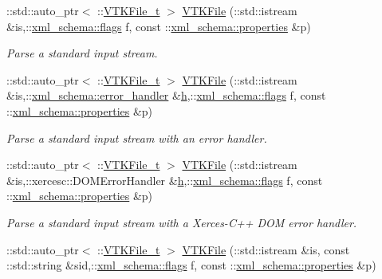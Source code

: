 \begin{DoxyCompactItemize}
\-::std\-::auto\-\_\-ptr$<$ \-::\hyperlink{classVTKFile__t}{V\-T\-K\-File\-\_\-t} $>$ \hyperlink{vtk-unstructured_8cpp_a614c44588111461ff8af6c4958a7f346}{V\-T\-K\-File} (\-::std\-::istream \&is,\-::\hyperlink{namespacexml__schema_a0612287d030cb2732d31a45b258fdc87}{xml\-\_\-schema\-::flags} f, const \-::\hyperlink{namespacexml__schema_a1a8ebac679580b41baebd62c7d641c1d}{xml\-\_\-schema\-::properties} \&p)
\begin{DoxyCompactList}\small\item\em Parse a standard input stream. \end{DoxyCompactList}\item 
\-::std\-::auto\-\_\-ptr$<$ \-::\hyperlink{classVTKFile__t}{V\-T\-K\-File\-\_\-t} $>$ \hyperlink{vtk-unstructured_8cpp_ae23aec4e78c9498c7c876f961fa7cf89}{V\-T\-K\-File} (\-::std\-::istream \&is,\-::\hyperlink{namespacexml__schema_a0a5d9528e9175cedf199984a8bb64d62}{xml\-\_\-schema\-::error\-\_\-handler} \&\hyperlink{MolSim_8cpp_aa6e8e201edf24007dc075bfef6e8210c}{h},\-::\hyperlink{namespacexml__schema_a0612287d030cb2732d31a45b258fdc87}{xml\-\_\-schema\-::flags} f, const \-::\hyperlink{namespacexml__schema_a1a8ebac679580b41baebd62c7d641c1d}{xml\-\_\-schema\-::properties} \&p)
\begin{DoxyCompactList}\small\item\em Parse a standard input stream with an error handler. \end{DoxyCompactList}\item 
\-::std\-::auto\-\_\-ptr$<$ \-::\hyperlink{classVTKFile__t}{V\-T\-K\-File\-\_\-t} $>$ \hyperlink{vtk-unstructured_8cpp_a973642863a68b619c0bca09536845eac}{V\-T\-K\-File} (\-::std\-::istream \&is,\-::xercesc\-::\-D\-O\-M\-Error\-Handler \&\hyperlink{MolSim_8cpp_aa6e8e201edf24007dc075bfef6e8210c}{h},\-::\hyperlink{namespacexml__schema_a0612287d030cb2732d31a45b258fdc87}{xml\-\_\-schema\-::flags} f, const \-::\hyperlink{namespacexml__schema_a1a8ebac679580b41baebd62c7d641c1d}{xml\-\_\-schema\-::properties} \&p)
\begin{DoxyCompactList}\small\item\em Parse a standard input stream with a Xerces-\/\-C++ D\-O\-M error handler. \end{DoxyCompactList}\item 
\-::std\-::auto\-\_\-ptr$<$ \-::\hyperlink{classVTKFile__t}{V\-T\-K\-File\-\_\-t} $>$ \hyperlink{vtk-unstructured_8cpp_a23832683b27b8e90f1ca393ddfe166f1}{V\-T\-K\-File} (\-::std\-::istream \&is, const \-::std\-::string \&sid,\-::\hyperlink{namespacexml__schema_a0612287d030cb2732d31a45b258fdc87}{xml\-\_\-schema\-::flags} f, const \-::\hyperlink{namespacexml__schema_a1a8ebac679580b41baebd62c7d641c1d}{xml\-\_\-schema\-::properties} \&p)

\end{DoxyCompactItemize}
